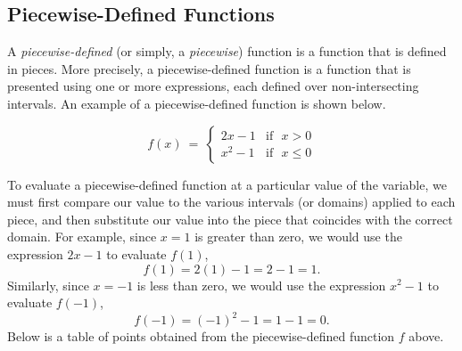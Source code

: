 \subsection{Piecewise-Defined Functions}

{}\pp

A \textit{piecewise-defined} (or simply, a \textit{piecewise}) function is a function that is defined in pieces.  More precisely, a piecewise-defined function is a function that is presented using one or more expressions, each defined over non-intersecting intervals.  An example of a piecewise-defined function is shown below.
\begin{center}
\[ f(x)~=~
	\begin{cases} 
      2x-1 & \text{if~~} x> 0\\
			x^2-1 & \text{if~~} x\leq 0
  \end{cases}
\]
\end{center}

To evaluate a piecewise-defined function at a particular value of the variable, we must first compare our value to the various intervals (or domains) applied to each piece, and then substitute our value into the piece that coincides with the correct domain.  For example, since $x=1$ is greater than zero, we would use the expression $2x-1$ to evaluate $f(1)$,
$$f(1)=2(1)-1=2-1=1.$$
Similarly, since $x=-1$ is less than zero, we would use the expression $x^2-1$ to evaluate $f(-1)$,
$$f(-1)=(-1)^2-1=1-1=0.$$
Below is a table of points obtained from the piecewise-defined function $f$ above. 
\newpage

